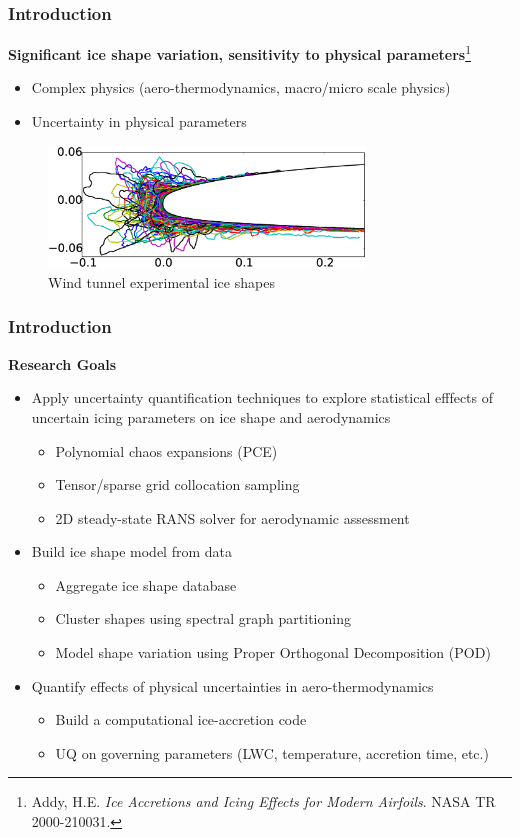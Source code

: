 \documentclass[9pt]{beamer}
\begin{document}
\begin{frame}
\frametitle{Introduction}
\label{sec-1-7}

\textbf{Significant ice shape variation, sensitivity to physical parameters}\footnote{Addy, H.E. \emph{Ice Accretions and Icing Effects for Modern Airfoils}. NASA TR 2000-210031.
 }
\begin{itemize}
\item Complex physics (aero-thermodynamics, macro/micro scale physics)
\item Uncertainty in physical parameters
\end{itemize}

\vspace*{-0.0cm}\begin{figure}
      \includegraphics[width=0.75\textwidth]{GlobalDataSet}
      \caption{Wind tunnel experimental ice shapes}
\end{figure}
\end{frame}
\begin{frame}
\frametitle{Introduction}
\label{sec-1-8}

\textbf{Research Goals}
\begin{itemize}
\item Apply uncertainty quantification techniques to explore statistical
  efffects of uncertain icing parameters on ice shape and aerodynamics
\begin{itemize}
\item Polynomial chaos expansions (PCE)
\item Tensor/sparse grid collocation sampling
\item 2D steady-state RANS solver for aerodynamic assessment
\end{itemize}
\item Build ice shape model from data
\begin{itemize}
\item Aggregate ice shape database
\item Cluster shapes using spectral graph partitioning
\item Model shape variation using Proper Orthogonal Decomposition (POD)
\end{itemize}
\item Quantify effects of physical uncertainties in aero-thermodynamics
\begin{itemize}
\item Build a computational ice-accretion code
\item UQ on governing parameters (LWC, temperature, accretion time, etc.)
\end{itemize}
\end{itemize}
\end{frame}
\end{document}
